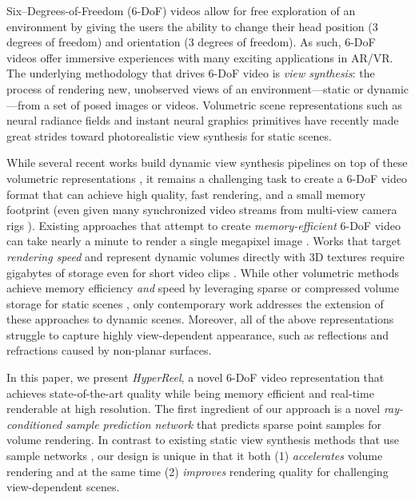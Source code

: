 \documentclass[10pt,twocolumn,letterpaper]{article}
\begin{document}
{Six--Degrees-of-Freedom (6-DoF) videos allow for free exploration of an environment by giving the users the ability to change their head position (3 degrees of freedom) and orientation (3 degrees of freedom). 
As such, 6-DoF videos offer immersive experiences with many exciting applications in AR/VR.
The underlying methodology that drives 6-DoF video is \emph{view synthesis}: the process of rendering new, unobserved views of an environment---static or dynamic---from a set of posed images or videos.
Volumetric scene representations such as neural radiance fields \cite{MildeSTBRN2020} and instant neural graphics primitives \cite{MuelleESK2022} have recently made great strides toward photorealistic view synthesis for static scenes.

While several recent works build dynamic view synthesis pipelines on top of these volumetric representations \cite{XianHKK2021, LiNSW2021, GaoSKH2021, ParkSBBGSB2021, LiSZGLKSLGL2022}, it remains a challenging task to create a 6-DoF video format that can achieve high quality, fast rendering, and a small memory footprint (even given many synchronized video streams from multi-view camera rigs \cite{sabater2017dataset, ParraTFHMSSC2019, BroxtFOEHDDBWD2020}).
Existing approaches that attempt to create \textit{memory-efficient} 6-DoF video can take nearly a minute to render a single megapixel image \cite{LiSZGLKSLGL2022}.
Works that target \textit{rendering speed} and represent dynamic volumes directly with 3D textures require gigabytes of storage even for short video clips \cite{WangZLZZZWXY2022}.
While other volumetric methods achieve memory efficiency \textit{and} speed by leveraging sparse or compressed volume storage for static scenes \cite{MuelleESK2022, ChenXGYS2022}, only contemporary work \cite{LiSWST2022, SongCLCCYXG2023} addresses the extension of these approaches to dynamic scenes.
Moreover, all of the above representations struggle to capture highly view-dependent appearance, such as reflections and refractions caused by non-planar surfaces.





In this paper, we present \emph{HyperReel}, a novel 6-DoF video representation that achieves state-of-the-art quality while being memory efficient and real-time renderable at high resolution.
The first ingredient of our approach is a novel \emph{ray-conditioned sample prediction network} that predicts sparse point samples for volume rendering.
In contrast to existing static view synthesis methods that use sample networks \cite{NeffSPKCKS2021, KurzNLZS2022},
our design is unique in that it both 
(1) \emph{accelerates} volume rendering and at the same time 
(2) \emph{improves} rendering quality for challenging view-dependent scenes.

}
\end{document}

